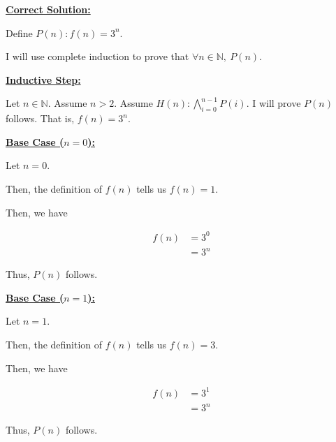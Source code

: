 \documentclass[12pt]{article}
\begin{document}
\begin{mdframed}
    \underline{\textbf{Correct Solution:}}

    \bigskip

    Define $P(n):f(n) = 3^n$.

    \bigskip

    I will use complete induction to prove that \color{red}$\forall n \in \mathbb{N}, \:P(n)$\color{black}.

    \bigskip

    \color{red}
    \underline{\textbf{Inductive Step:}}

    \bigskip

    Let $n \in \mathbb{N}$. Assume $n > 2$. Assume
    $H(n):\bigwedge\limits_{i=0}^{n-1} P(i)$. I will prove $P(n)$ follows.
    That is, $f(n) = 3^n$.
    \color{black}

    \bigskip

    \underline{\textbf{Base Case ($n = 0$):}}

    \bigskip

    Let $n = 0$.

    \bigskip

    Then, the definition of $f(n)$ tells us $f(n) = 1$.

    \bigskip

    Then, we have

    \begin{align}
        f(n) &= 3^0\\
        &= 3^n
    \end{align}

    \bigskip

    Thus, $P(n)$ follows.

    \bigskip

    \underline{\textbf{Base Case ($n = 1$):}}

    \bigskip

    Let $n = 1$.

    \bigskip

    Then, the definition of $f(n)$ tells us $f(n) = 3$.

    \bigskip

    Then, we have

    \begin{align}
        f(n) &= 3^1\\
        &= 3^n
    \end{align}

    \bigskip

    Thus, $P(n)$ follows.


\end{mdframed}
\end{document}
